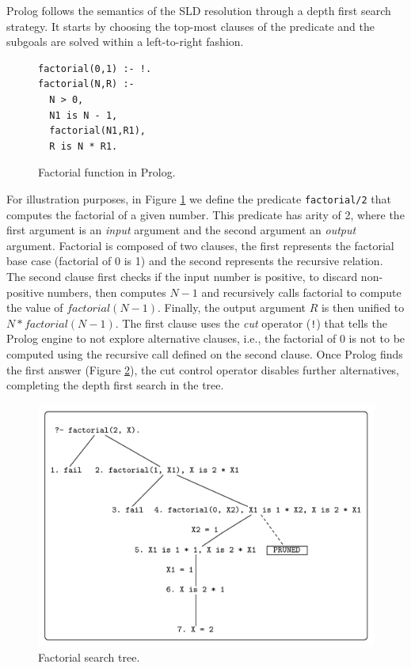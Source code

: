 Prolog follows the semantics of the SLD resolution through a depth first search strategy.
It starts by choosing the top-most clauses of the predicate and the subgoals are solved
within a left-to-right fashion.

\begin{figure}[ht]
\begin{verbatim}
factorial(0,1) :- !.
factorial(N,R) :-
  N > 0,
  N1 is N - 1,
  factorial(N1,R1),
  R is N * R1.
\end{verbatim}
\caption{Factorial function in Prolog.}
\label{fig:factorial_prolog}
\end{figure}

For illustration purposes, in Figure \ref{fig:factorial_prolog} we define the predicate \texttt{factorial/2} that
computes the factorial of a given number. This predicate has arity of 2, where the first argument is an
\textit{input} argument and the second argument an \textit{output} argument.
Factorial is composed of two clauses, the first represents the factorial base case (factorial of 0 is 1) and
the second represents the recursive relation. The second clause first checks if the input number
is positive, to discard non-positive numbers, then computes $N - 1$ and recursively
calls factorial to compute the value of $factorial(N-1)$. Finally, the output argument $R$ is then unified
to $N * factorial(N-1)$. The first clause uses the \textit{cut} operator (\texttt{!})
that tells the Prolog engine to not explore alternative clauses, i.e., the factorial of 0 is not to be
computed using the recursive call defined on the second clause.
Once Prolog finds the first answer (Figure \ref{fig:factorial_tree}), the cut control operator disables further
alternatives, completing the depth first search in the tree.

\begin{figure}[ht]
  \centering
    \includegraphics[scale=0.6]{factorial.pdf}
  \caption{Factorial search tree.}
  \label{fig:factorial_tree}
\end{figure}

